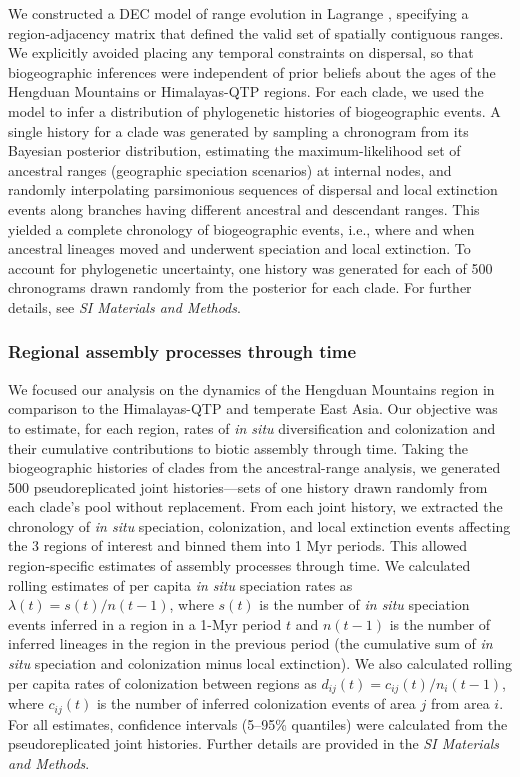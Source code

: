 We constructed a DEC model of range evolution in Lagrange \citep{Ree2005,Ree2008}, specifying a region-adjacency matrix that defined the valid set of spatially contiguous ranges. We explicitly avoided placing any temporal constraints on dispersal, so that biogeographic inferences were independent of prior beliefs about the ages of the Hengduan Mountains or Himalayas-QTP regions. For each clade, we used the model to infer a distribution of phylogenetic histories of biogeographic events. A single history for a clade was generated by sampling a chronogram from its Bayesian posterior distribution, estimating the maximum-likelihood set of ancestral ranges (geographic speciation scenarios) at internal nodes, and randomly interpolating parsimonious sequences of dispersal and local extinction events along branches having different ancestral and descendant ranges. This yielded a complete chronology of biogeographic events, i.e., where and when ancestral lineages moved and underwent speciation and local extinction. To account for phylogenetic uncertainty, one history was generated for each of 500 chronograms drawn randomly from the posterior for each clade. For further details, see \textit{SI Materials and Methods}.

\subsubsection{Regional assembly processes through time}

We focused our analysis on the dynamics of the Hengduan Mountains region in comparison to the Himalayas-QTP and temperate East Asia. Our objective was to estimate, for each region, rates of \textit{in situ} diversification and colonization and their cumulative contributions to biotic assembly through time. Taking the biogeographic histories of clades from the ancestral-range analysis, we generated 500 pseudoreplicated joint histories---sets of one history drawn randomly from each clade's pool without replacement. From each joint history, we extracted the chronology of \textit{in situ} speciation, colonization, and local extinction events affecting the 3 regions of interest and binned them into 1 Myr periods. This allowed region-specific estimates of assembly processes through time. We calculated rolling estimates of per capita \textit{in situ} speciation rates as $\lambda(t) = s(t)/n(t-1)$, where $s(t)$ is the number of \textit{in situ} speciation events inferred in a region in a 1-Myr period $t$ and $n(t-1)$ is the number of inferred lineages in the region in the previous period (the cumulative sum of \textit{in situ} speciation and colonization minus local extinction). We also calculated rolling per capita rates of colonization between regions as $d_{ij}(t) = c_{ij}(t)/n_i(t-1)$, where $c_{ij}(t)$ is the number of inferred colonization events of area $j$ from area $i$. For all estimates, confidence intervals (5--95\% quantiles) were calculated from the pseudoreplicated joint histories. Further details are provided in the \textit{SI Materials and Methods}.


